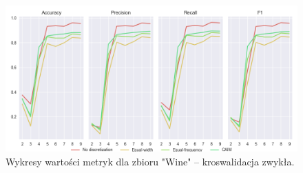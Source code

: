 
\begin{figure}[H]
\center
    \includegraphics[width=\textwidth]{img/cv_scores_kfold/scoring_kfold_wine.png}
    \caption{Wykresy wartości metryk dla zbioru "Wine" -- kroswalidacja zwykła.}
\end{figure}

